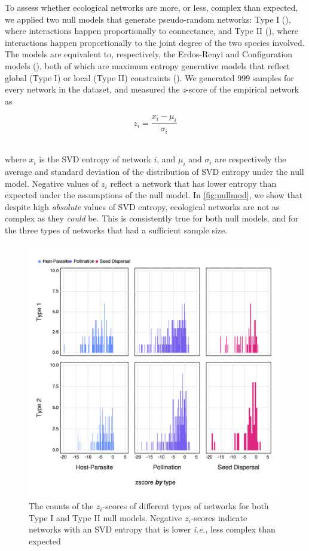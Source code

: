 \begin{refsection}
To assess whether ecological networks are more, or less, complex than expected,
we applied two null models that generate pseudo-random networks: Type I
(\cite{Fortuna2006HabLos}), where interactions happen proportionally to
connectance, and Type II (\cite{Bascompte2003Nested}), where interactions happen
proportionally to the joint degree of the two species involved. The models are
equivalent to, respectively, the Erdos-Renyi and Configuration models
(\cite{Newman2010NetInt}), both of which are maximum entropy generative models
that reflect global (Type I) or local (Type II) constraints
(\cite{Park2004Statistical}). We generated 999 samples for every network in the
dataset, and measured the \emph{z}-score of the empirical network as

\[z_i = \frac{x_i-\mu_i}{\sigma_i}\]\

where \(x_i\) is the SVD entropy of network \(i\), and \(\mu_i\) and
\(\sigma_i\) are respectively the average and standard deviation of the
distribution of SVD entropy under the null model. Negative values of \(z_i\)
reflect a network that has lower entropy than expected under the assumptions of
the null model. In \autoref{fig:nullmod}, we show that despite high
\emph{absolute} values of SVD entropy, ecological networks are not as complex as
they \emph{could} be. This is consistently true for both null models, and for
the three types of networks that had a sufficient sample size.

\begin{figure}[h]
    \centering
    \includegraphics[width=\textwidth]{figures/nullmodel_histogram.png}
    \caption{The counts of the \(z_i\)-scores of different types of networks for
both Type I and Type II null models. Negative \(z_i\)-scores indicate networks
with an SVD entropy that is lower \emph{i.e.,} less complex than expected}
    \label{fig:nullmod}
\end{figure}


\end{refsection}
